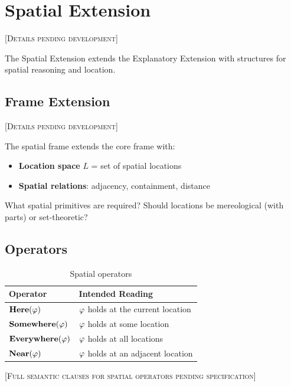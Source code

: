 \documentclass[../LogosReference.tex]{subfiles}
\begin{document}

\section{Spatial Extension}\label{sec:spatial}

\textsc{[Details pending development]}

The Spatial Extension extends the Explanatory Extension with structures for spatial reasoning
and location.


\subsection{Frame Extension}\label{sec:spatial-frame}

\textsc{[Details pending development]}

The spatial frame extends the core frame with:
\begin{itemize}
  \item \textbf{Location space} $L$ = set of spatial locations
  \item \textbf{Spatial relations}: adjacency, containment, distance
\end{itemize}

\begin{question}
What spatial primitives are required?
Should locations be mereological (with parts) or set-theoretic?
\end{question}


\subsection{Operators}\label{sec:spatial-operators}

\begin{table}[h]
\centering
\begin{tabular}{ll}
\toprule
\textbf{Operator} & \textbf{Intended Reading} \\
\midrule
$\textbf{Here}(\varphi)$ & $\varphi$ holds at the current location \\
$\textbf{Somewhere}(\varphi)$ & $\varphi$ holds at some location \\
$\textbf{Everywhere}(\varphi)$ & $\varphi$ holds at all locations \\
$\textbf{Near}(\varphi)$ & $\varphi$ holds at an adjacent location \\
\bottomrule
\end{tabular}
\caption{Spatial operators}
\label{tab:spatial-operators}
\end{table}

\textsc{[Full semantic clauses for spatial operators pending specification]}
\end{document}
